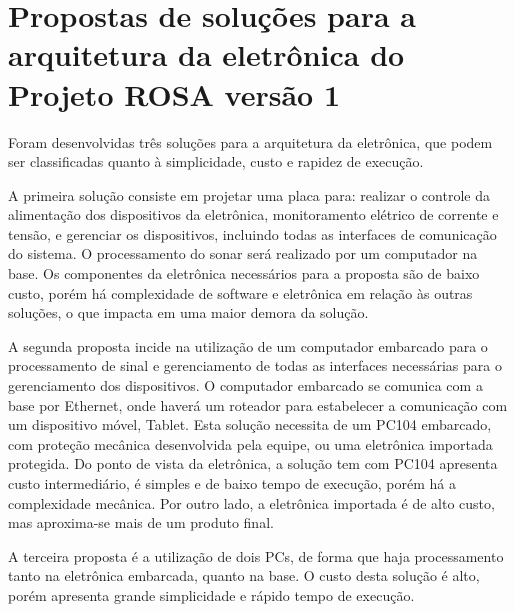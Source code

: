 


\section{Propostas de soluções para a arquitetura da eletrônica do Projeto ROSA
versão 1}

Foram desenvolvidas três soluções para a arquitetura da eletrônica, que podem
ser classificadas quanto à simplicidade, custo e rapidez de execução.

A primeira solução consiste em projetar uma placa para: realizar o
controle da alimentação dos dispositivos da eletrônica, monitoramento elétrico
de corrente e tensão, e gerenciar os dispositivos, incluindo todas as interfaces
de comunicação do sistema. O processamento do sonar será realizado por um
computador na base. Os componentes da eletrônica necessários para a proposta são de baixo
custo, porém há complexidade de software e eletrônica em relação às outras
soluções, o que impacta em uma maior demora da solução.

A segunda proposta incide na utilização de um computador embarcado para o
processamento de sinal e gerenciamento de todas as interfaces necessárias para o gerenciamento
dos dispositivos. O computador embarcado se comunica com a base por Ethernet,
onde haverá um roteador para estabelecer a comunicação com um dispositivo móvel,
Tablet.
Esta solução necessita de um PC104 embarcado, com proteção mecânica desenvolvida
pela equipe, ou uma eletrônica importada protegida. Do ponto de vista da
eletrônica, a solução tem com PC104 apresenta custo intermediário, é simples e
de baixo tempo de execução, porém há a complexidade mecânica. Por outro lado, a
eletrônica importada é de alto custo, mas aproxima-se mais de um produto final.

A terceira proposta é a utilização de dois PCs, de forma que haja processamento
tanto na eletrônica embarcada, quanto na base. O custo desta solução é alto,
porém apresenta grande simplicidade e rápido tempo de execução.